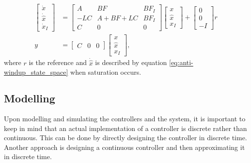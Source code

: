 \documentclass[../../main.tex]{subfiles}
\begin{document}
\begin{equation}\label{eq:state_space_modern_control}
\begin{split}
\begin{bmatrix}
        \dot{x} \\
        \dot{\hat{x}}\\
        \dot{x}_I
    \end{bmatrix} &=
    \begin{bmatrix}
        A & BF & BF_I \\
        -LC & A+BF+LC & BF_I \\
        C & 0 & 0
    \end{bmatrix}
    \begin{bmatrix}
        x \\
        \hat{x} \\
        x_I
    \end{bmatrix}
    + 
    \begin{bmatrix}
    0\\
    0\\
    -I
    \end{bmatrix}
    r \\
    y &= \begin{bmatrix}
        C & 0 & 0
    \end{bmatrix}     
    \begin{bmatrix}
        x \\
        \hat{x} \\
        x_I
    \end{bmatrix}, 
    \end{split}
\end{equation}
where $r$ is the reference and $\Dot{\hat{x}}$ is described by equation \ref{eq:anti-windup_state_space} when saturation occurs.

\subsection*{Modelling}
Upon modelling and simulating the controllers and the system, it is important to keep in mind that an actual implementation of a controller is discrete rather than continuous. This can be done by directly designing the controller in discrete time. Another approach is designing a continuous controller and then approximating it in discrete time.
\end{document}
